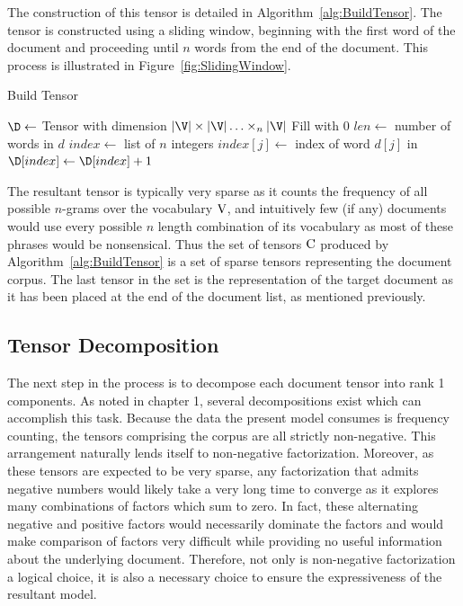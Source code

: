 \documentclass[../ut-dissertation.tex]{subfiles}
\begin{document}
The construction of this tensor is detailed in
Algorithm~\ref{alg:BuildTensor}.  The tensor is constructed using a
sliding window, beginning with the first word of the document
and proceeding until $n$ words from the end of the document.  This
process is illustrated in Figure~\ref{fig:SlidingWindow}.
\begin{algorithm}
  \caption{Build Tensor}
  \label{alg:BuildTensor}
    
  
  \Output{\D}
  \BlankLine
  $\D \leftarrow $ Tensor with dimension $|\V| \times |\V| \ldots
  \times_n |\V|$\;
  Fill \D with 0\;
  $len \leftarrow$ number of words in $d$\;
   {
    $index \leftarrow$ list of $n$ integers\;
     {
      $index[j] \leftarrow$ index of word $d[j]$ in \V\;
    }
    \BlankLine
    $\D[index] \leftarrow \D[index] + 1$\;
  }
  \Return{\D}
\end{algorithm}

The resultant tensor is typically very sparse as it counts the
frequency of all possible $n$-grams over the vocabulary $\mathrm{V}$, and
intuitively few (if any) documents would use every possible $n$ length
combination of its vocabulary as most of these phrases would be
nonsensical.  Thus the set of tensors $\mathrm{C}$ produced by
Algorithm~\ref{alg:BuildTensor} is a set of sparse tensors representing
the document corpus.  The last tensor in the set is the representation
of the target document as it has been placed at the end of the
document list, as mentioned previously.

\subsection{Tensor Decomposition}
The next step in the process is to decompose each document tensor into
rank 1 components.  As noted in chapter 1, several decompositions
exist which can accomplish this task.  Because the data the present
model consumes is frequency counting, the tensors comprising the
corpus are all strictly non-negative.  This arrangement naturally
lends itself to non-negative factorization.  Moreover, as these
tensors are expected to be very sparse, any factorization that admits
negative numbers would likely take a very long time to converge as it
explores many combinations of factors which sum to zero.  In fact,
these alternating negative and positive factors would necessarily
dominate the factors and would make comparison of factors very
difficult while providing no useful information about the underlying
document.  Therefore, not only is non-negative factorization a logical
choice, it is also a necessary choice to ensure the expressiveness of
the resultant model.
\end{document}
